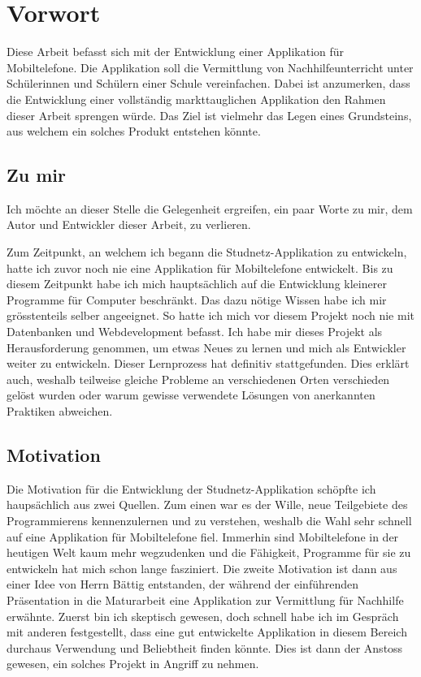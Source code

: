 \documentclass[../main.tex]{subfiles}
\begin{document}
\chapter*{Vorwort}
Diese Arbeit befasst sich mit der Entwicklung einer Applikation für Mobiltelefone. Die Applikation soll die Vermittlung von Nachhilfeunterricht unter Schülerinnen und Schülern einer Schule vereinfachen. Dabei ist anzumerken, dass die Entwicklung einer vollständig markttauglichen Applikation den Rahmen dieser Arbeit sprengen würde. Das Ziel ist vielmehr das Legen eines Grundsteins, aus welchem ein solches Produkt entstehen könnte.

\section*{Zu mir}
Ich möchte an dieser Stelle die Gelegenheit ergreifen, ein paar Worte zu mir, dem Autor und Entwickler dieser Arbeit, zu verlieren.
	
Zum Zeitpunkt, an welchem ich begann die Studnetz-Applikation zu entwickeln, hatte ich zuvor noch nie eine Applikation für Mobiltelefone entwickelt. Bis zu diesem Zeitpunkt habe ich mich hauptsächlich auf die Entwicklung kleinerer Programme für Computer beschränkt. Das dazu nötige Wissen habe ich mir grösstenteils selber angeeignet. So hatte ich mich vor diesem Projekt noch nie mit Datenbanken und Webdevelopment befasst. Ich habe mir dieses Projekt als Herausforderung genommen, um etwas Neues zu lernen und mich als Entwickler weiter zu entwickeln. Dieser Lernprozess hat definitiv stattgefunden. Dies erklärt auch, weshalb teilweise gleiche Probleme an verschiedenen Orten verschieden gelöst wurden oder warum gewisse verwendete Lösungen von anerkannten Praktiken abweichen.

\section*{Motivation}
Die Motivation für die Entwicklung der Studnetz-Applikation schöpfte ich haupsächlich aus zwei Quellen. Zum einen war es der Wille, neue Teilgebiete des Programmierens kennenzulernen und zu verstehen, weshalb die Wahl sehr schnell auf eine Applikation für Mobiltelefone fiel. Immerhin sind Mobiltelefone in der heutigen Welt kaum mehr wegzudenken und die Fähigkeit, Programme für sie zu entwickeln hat mich schon lange fasziniert. Die zweite Motivation ist dann aus einer Idee von Herrn Bättig entstanden, der während der einführenden Präsentation in die Maturarbeit eine Applikation zur Vermittlung für Nachhilfe erwähnte. Zuerst bin  ich skeptisch gewesen, doch schnell habe ich im Gespräch mit anderen festgestellt, dass eine gut entwickelte Applikation in diesem Bereich durchaus Verwendung und Beliebtheit finden könnte. Dies ist dann der Anstoss gewesen, ein solches Projekt in Angriff zu nehmen. 
	
\end{document}
